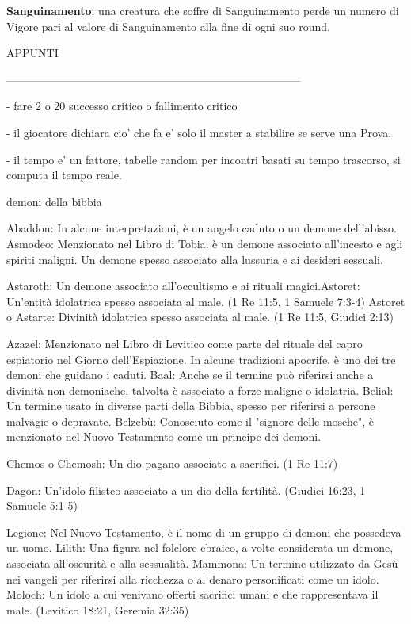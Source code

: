 \documentclass[12pt,a4paper,twoside,openany]{book}
\begin{document}
\textbf{Sanguinamento}: una creatura che soffre di Sanguinamento perde un numero di Vigore pari al valore di Sanguinamento alla fine di ogni suo round.

\pagebreak
\pagebreak


APPUNTI
\pagebreak
\pagebreak





--------------------------------------------------------------------------------



- fare 2 o 20  successo critico o fallimento  critico

- il giocatore dichiara cio' che fa e' solo il master a stabilire se serve una Prova. 

- il tempo e' un fattore, tabelle random per incontri basati su tempo trascorso, si computa il tempo reale.



demoni della bibbia

Abaddon: In alcune interpretazioni, è un angelo caduto o un demone dell'abisso.
Asmodeo: Menzionato nel Libro di Tobia, è un demone associato all'incesto e agli spiriti maligni. Un demone spesso associato alla lussuria e ai desideri sessuali.

Astaroth: Un demone associato all'occultismo e ai rituali magici.Astoret: Un'entità idolatrica spesso associata al male. (1 Re 11:5, 1 Samuele 7:3-4)
Astoret o Astarte: Divinità idolatrica spesso associata al male. (1 Re 11:5, Giudici 2:13)



Azazel: Menzionato nel Libro di Levitico come parte del rituale del capro espiatorio nel Giorno dell'Espiazione. In alcune tradizioni apocrife, è uno dei tre demoni che guidano i caduti.
Baal: Anche se il termine può riferirsi anche a divinità non demoniache, talvolta è associato a forze maligne o idolatria.
Belial: Un termine usato in diverse parti della Bibbia, spesso per riferirsi a persone malvagie o depravate.
Belzebù: Conosciuto come il "signore delle mosche", è menzionato nel Nuovo Testamento come un principe dei demoni.

Chemos o Chemosh: Un dio pagano associato a sacrifici. (1 Re 11:7)


Dagon: Un'idolo filisteo associato a un dio della fertilità. (Giudici 16:23, 1 Samuele 5:1-5)


Legione: Nel Nuovo Testamento, è il nome di un gruppo di demoni che possedeva un uomo.
Lilith: Una figura nel folclore ebraico, a volte considerata un demone, associata all'oscurità e alla sessualità.
Mammona: Un termine utilizzato da Gesù nei vangeli per riferirsi alla ricchezza o al denaro personificati come un idolo.
Moloch: Un idolo a cui venivano offerti sacrifici umani e che rappresentava il male. (Levitico 18:21, Geremia 32:35)
\end{document}
